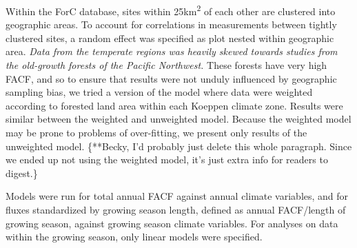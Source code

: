 \documentclass[]{article}
\begin{document}
Within the ForC database, sites within 25km\textsuperscript{2} of each
other are clustered into geographic areas. To account for correlations
in measurements between tightly clustered sites, a random effect was
specified as plot nested within geographic area. \emph{Data from the
temperate regions was heavily skewed towards studies from the old-growth
forests of the Pacific Northwest.} These forests have very high FACF,
and so to ensure that results were not unduly influenced by geographic
sampling bias, we tried a version of the model where data were weighted
according to forested land area within each Koeppen climate zone.
Results were similar between the weighted and unweighted model. Because
the weighted model may be prone to problems of over-fitting, we present
only results of the unweighted model. \{**Becky, I'd probably just
delete this whole paragraph. Since we ended up not using the weighted
model, it's just extra info for readers to digest.\}

Models were run for total annual FACF against annual climate variables,
and for fluxes standardized by growing season length, defined as annual
FACF/length of growing season, against growing season climate variables.
For analyses on data within the growing season, only linear models were
specified.
\end{document}

